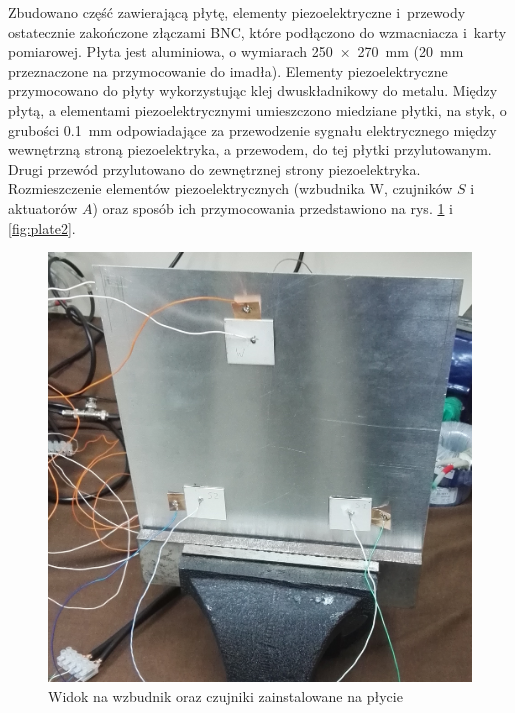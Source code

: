 \documentclass[polish,a4paper,11pt]{mwart}
\begin{document}
Zbudowano część zawierającą płytę, elementy piezoelektryczne i~przewody
ostatecznie zakończone złączami BNC, które podłączono do wzmacniacza i~karty
pomiarowej.  Płyta jest aluminiowa, o wymiarach \SI{250 x 270}{\milli\meter}
(\SI{20}{\milli\meter}
przeznaczone na przymocowanie do imadła). Elementy piezoelektryczne
przymocowano do płyty wykorzystując klej dwuskładnikowy do metalu. Między
płytą, a elementami piezoelektrycznymi umieszczono miedziane płytki, na styk, o
grubości \SI{0.1}{\milli\meter} odpowiadające za przewodzenie sygnału elektrycznego między
wewnętrzną stroną piezoelektryka, a przewodem, do tej płytki przylutowanym.
Drugi przewód przylutowano do zewnętrznej strony piezoelektryka. Rozmieszczenie
elementów piezoelektrycznych (wzbudnika W, czujników $S$ i aktuatorów $A$) oraz
sposób ich przymocowania przedstawiono na rys. \ref{fig:plate1} i
\ref{fig:plate2}.

\begin{figure}[!tbh]
  \centering
  \includegraphics[width=\textwidth]{./bitgraphics/plate1.jpg}
  \caption{Widok na wzbudnik oraz czujniki zainstalowane na płycie}
  \label{fig:plate1}
\end{figure}
\end{document}
